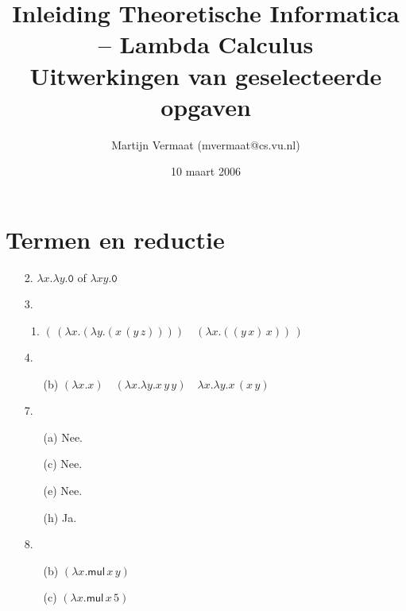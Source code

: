 \documentclass[a4paper,11pt]{article}
\title{Inleiding Theoretische Informatica -- Lambda Calculus\\
\normalsize{Uitwerkingen van geselecteerde opgaven}}
\author{Martijn Vermaat (mvermaat@cs.vu.nl)}
\date{10 maart 2006}
\begin{document}
\maketitle


\section{Termen en reductie}


\begin{enumerate}


\item[2.]
$\lambda x. \lambda y. \texttt{0}$ of $\lambda xy. \texttt{0}$


\item[3.]

\begin{enumerate}

\item
$( \, (\lambda x. (\lambda y. (x \, (y \, z)))) \quad (\lambda x. ((y \, x) \, x)) \, )$

\end{enumerate}


\item[4.]

\begin{enumerate}

\item[(b)]
$(\lambda x. x) \quad (\lambda x. \lambda y. x \, y \, y) \quad \lambda x. \lambda y. x \, (x \, y)$

\end{enumerate}


\item[7.]

\begin{enumerate}

\item[(a)] Nee.
\item[(c)] Nee.
\item[(e)] Nee.
\item[(h)] Ja.

\end{enumerate}


\item[8.]

\begin{enumerate}

\item[(b)] $(\lambda x. \textsf{mul} \, x \, y)$

\item[(c)] $(\lambda x. \textsf{mul} \, x \, 5)$


\end{enumerate}
\end{enumerate}
\end{document}
